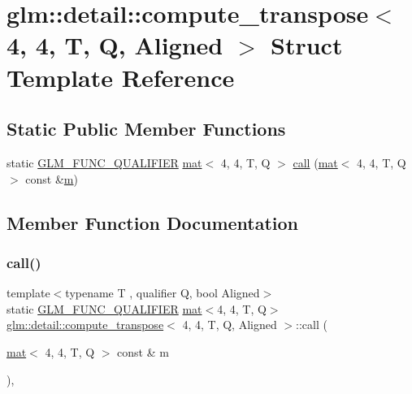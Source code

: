 \hypertarget{structglm_1_1detail_1_1compute__transpose_3_014_00_014_00_01_t_00_01_q_00_01_aligned_01_4}{}\section{glm\+:\+:detail\+:\+:compute\+\_\+transpose$<$ 4, 4, T, Q, Aligned $>$ Struct Template Reference}
\label{structglm_1_1detail_1_1compute__transpose_3_014_00_014_00_01_t_00_01_q_00_01_aligned_01_4}
\subsection*{Static Public Member Functions}
\begin{DoxyCompactItemize}
\item 
static \mbox{\hyperlink{setup_8hpp_a33fdea6f91c5f834105f7415e2a64407}{G\+L\+M\+\_\+\+F\+U\+N\+C\+\_\+\+Q\+U\+A\+L\+I\+F\+I\+ER}} \mbox{\hyperlink{structglm_1_1mat}{mat}}$<$ 4, 4, T, Q $>$ \mbox{\hyperlink{structglm_1_1detail_1_1compute__transpose_3_014_00_014_00_01_t_00_01_q_00_01_aligned_01_4_a1c83bd028bacc75a9992bae671fdace4}{call}} (\mbox{\hyperlink{structglm_1_1mat}{mat}}$<$ 4, 4, T, Q $>$ const \&\mbox{\hyperlink{_s_d_l__opengl__glext_8h_af593500c283bf1a787a6f947f503a5c2}{m}})
\end{DoxyCompactItemize}


\subsection{Member Function Documentation}
\mbox{\label{structglm_1_1detail_1_1compute__transpose_3_014_00_014_00_01_t_00_01_q_00_01_aligned_01_4_a1c83bd028bacc75a9992bae671fdace4}} 
\subsubsection{\texorpdfstring{call()}{call()}}
{\footnotesize\ttfamily template$<$typename T , qualifier Q, bool Aligned$>$ \\
static \mbox{\hyperlink{setup_8hpp_a33fdea6f91c5f834105f7415e2a64407}{G\+L\+M\+\_\+\+F\+U\+N\+C\+\_\+\+Q\+U\+A\+L\+I\+F\+I\+ER}} \mbox{\hyperlink{structglm_1_1mat}{mat}}$<$4, 4, T, Q$>$ \mbox{\hyperlink{structglm_1_1detail_1_1compute__transpose}{glm\+::detail\+::compute\+\_\+transpose}}$<$ 4, 4, T, Q, Aligned $>$\+::call (\begin{DoxyParamCaption}\item[{\mbox{\hyperlink{structglm_1_1mat}{mat}}$<$ 4, 4, T, Q $>$ const \&}]{m }\end{DoxyParamCaption})\hspace{0.3cm}{\ttfamily [inline]}, {\ttfamily [static]}}



